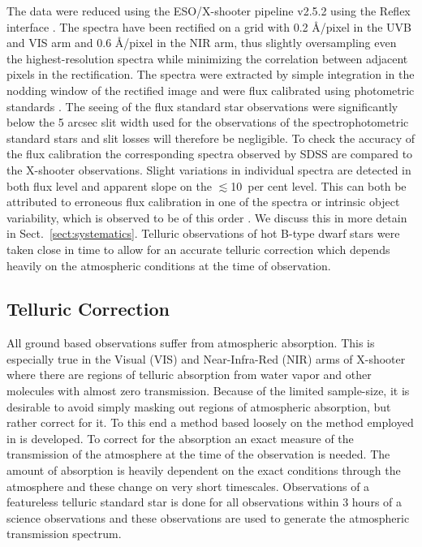 \documentclass{aa}    %
\newcommand{\sectionname}{Sect.}
\newcommand{\Sect}[1]{\sectionname~\ref{sect:#1}}
\newcommand{\sect}[1]{\Sect{#1}}
\newcommand{\sectlabel}[1]{\label{sect:#1}}
\begin{document}
The data were reduced using the ESO/X-shooter pipeline v2.5.2 \citep{Modigliani2010} using the Reflex interface \citep{Freudling2013}. The spectra have been rectified on a grid with 0.2 \AA/pixel in the UVB and VIS arm and 0.6 \AA/pixel in the NIR arm, thus slightly oversampling even the highest-resolution spectra while minimizing the correlation between adjacent pixels in the rectification. The spectra were extracted by simple integration in the nodding window of the rectified image and were flux calibrated using photometric standards \citep{Vernet2010, Hamuy1994}. The seeing of the flux standard star observations were significantly below the 5 arcsec slit width used for the observations of the spectrophotometric standard stars and slit losses will therefore be negligible. To check the accuracy of the flux calibration the corresponding spectra observed by SDSS \citep{Ahn2014} are compared to the X-shooter observations. Slight variations in individual spectra are detected in both flux level and apparent slope on the $\lesssim$10~per cent level. This can both be attributed to erroneous flux calibration in one of the spectra or intrinsic object variability, which is observed to be of this order \citep{MacLeod2012, Morganson2014}. We discuss this in more detain in \sect{systematics}.
Telluric observations of hot B-type dwarf stars were taken close in time to allow for an accurate telluric correction which depends heavily on the atmospheric conditions at the time of observation.







\subsection{Telluric Correction}   \sectlabel{telluric}

All ground based observations suffer from atmospheric absorption. This is especially true in the Visual (VIS) and Near-Infra-Red (NIR) arms of X-shooter where there are regions of telluric absorption from water vapor and other molecules with almost zero transmission. Because of the limited sample-size, it is desirable to avoid simply masking out regions of atmospheric absorption, but rather correct for it. To this end a method based loosely on the method employed in \citet{Chen2014} is developed.
To correct for the absorption an exact measure of the transmission of the atmosphere at the time of the observation is needed. The amount of absorption is heavily dependent on the exact conditions through the atmosphere and these change on very short timescales. Observations of a featureless telluric standard star is done for all observations within 3 hours of a science observations and these observations are used to generate the atmospheric transmission spectrum. 
\end{document}
